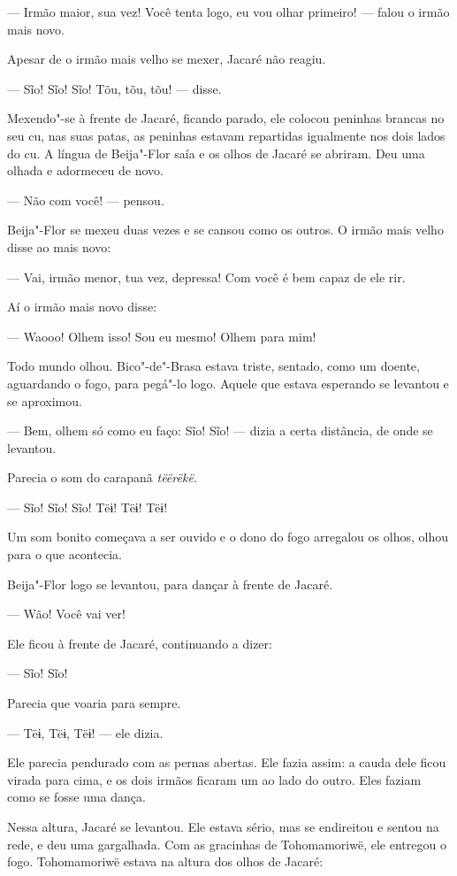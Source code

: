 --- Irmão maior, sua vez! Você tenta logo, eu vou olhar primeiro! ---
falou o irmão mais novo. 

Apesar de o irmão mais velho se mexer, Jacaré não reagiu.

--- Sĩo! Sĩo! Sĩo! Tõu, tõu, tõu! --- disse.

Mexendo"-se à frente de Jacaré, ficando parado, ele colocou peninhas
brancas no seu cu, nas suas patas, as peninhas estavam repartidas
igualmente nos dois lados do cu. A língua de Beija"-Flor saía e os
olhos de Jacaré se abriram. Deu uma olhada e adormeceu de novo. 

--- Não com você! --- pensou. 

Beija"-Flor se mexeu duas vezes e se cansou como os outros.
O irmão mais velho disse ao mais novo: 

--- Vai, irmão menor, tua vez, depressa! Com você é bem capaz de ele
rir.

Aí o irmão mais novo disse:

--- Waooo! Olhem isso! Sou eu mesmo! Olhem para mim! 

Todo mundo olhou. Bico"-de"-Brasa estava triste, sentado, como um
doente, aguardando o fogo, para pegá"-lo logo. Aquele que estava esperando
se levantou e se aproximou. 

--- Bem, olhem só como eu faço: Sĩo! Sĩo! --- dizia a certa
distância, de onde se levantou. 

Parecia o som do carapanã \emph{tëërëkë.}

--- Sĩo! Sĩo! Sĩo! Tëɨ! Tëɨ! Tëɨ!

Um som bonito começava a ser ouvido e o dono do fogo arregalou os olhos,
olhou para o que acontecia.

Beija"-Flor logo se levantou, para dançar à frente de Jacaré.

--- Wão! Você vai ver!

Ele ficou à frente de Jacaré, continuando a dizer:

--- Sĩo! Sĩo!

Parecia que voaria para sempre. 


--- Tëɨ, Tëɨ, Tëɨ! --- ele dizia. 

Ele parecia pendurado com as pernas abertas. Ele fazia assim: a cauda
dele ficou virada para cima, e os dois irmãos ficaram um ao lado do
outro. Eles faziam como se fosse uma dança. 


Nessa altura, Jacaré se levantou. Ele estava sério, mas se endireitou e
sentou na rede, e deu uma gargalhada. Com as gracinhas de Tohomamoriwë,
ele entregou o fogo. Tohomamoriwë estava na altura dos olhos de Jacaré: 


